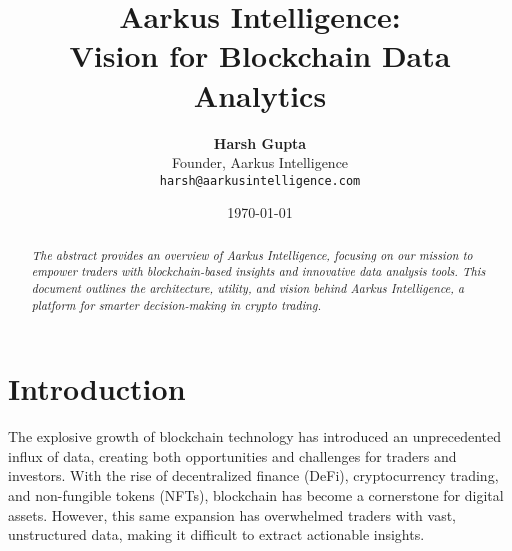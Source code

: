 \documentclass{article}
\title{\Huge \textbf{Aarkus Intelligence: \\ Vision for Blockchain Data Analytics}}
\author{
  \textbf{Harsh Gupta} \\
  Founder, Aarkus Intelligence \\
  \texttt{harsh@aarkusintelligence.com}
}
\date{\today}
\begin{document}
\maketitle
\thispagestyle{empty} %

\begin{abstract}
\textit{
The abstract provides an overview of Aarkus Intelligence, focusing on our mission to empower traders with blockchain-based insights and innovative data analysis tools. This document outlines the architecture, utility, and vision behind Aarkus Intelligence, a platform for smarter decision-making in crypto trading.
}
\end{abstract}

\tableofcontents

\newpage
\section{Introduction}
The explosive growth of blockchain technology has introduced an unprecedented influx of data, creating both opportunities and challenges for traders and investors. With the rise of decentralized finance (DeFi), cryptocurrency trading, and non-fungible tokens (NFTs), blockchain has become a cornerstone for digital assets. However, this same expansion has overwhelmed traders with vast, unstructured data, making it difficult to extract actionable insights.


  
  
  
  
\end{document}
